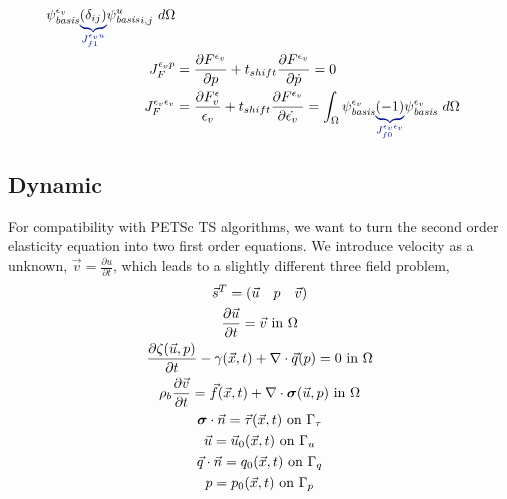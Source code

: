 \begin{align}
  \basisscalar[\epsilon_{v}] \eqnannotate{\left(\delta_{ij}\right)}{J_{f1}^{\epsilon_{v}u}}
  \basisscalar[u]_{i,j} \ d\Omega                                                                                                                                                                                                                             \\
  J_F^{\epsilon_{v}p}            & = \frac{\partial F^{\epsilon_{v}}}{\partial p} + t_{shift} \frac{\partial F^{\epsilon_{v}}}{\partial \dot{p}} = 0                                                                                                          \\
  J_F^{\epsilon_{v}\epsilon_{v}} & = \frac{\partial F^\epsilon_{v}}{\epsilon_{v}} + t_{shift} \frac{\partial F^{\epsilon_{v}}}{\partial \dot{\epsilon_{v}}} =
  \int_{\Omega} \basisscalar[\epsilon_{v}] \eqnannotate{\left(-1\right)}{J_{f0}^{\epsilon_{v}\epsilon_{v}}} \basisscalar[\epsilon_{v}] \ d\Omega
\end{align}

\subsection{Dynamic}

For compatibility with PETSc TS algorithms, we want to turn the second
order elasticity equation into two first order equations. We introduce
velocity as a unknown, $\vec{v}=\frac{\partial u}{\partial t}$, which
leads to a slightly different three field problem,
\begin{gather}
  \vec{s}^{T} = \left(\vec{u} \quad p \quad \vec{v}\right) \\
  \frac{\partial \vec{u}}{\partial t} = \vec{v} \text{ in } \Omega \\
  \frac{\partial \zeta(\vec{u},p)}{\partial t } - \gamma(\vec{x},t) + \nabla \cdot \vec{q}(p) = 0 \text{ in } \Omega \\
  \rho_{b} \frac{\partial \vec{v}}{\partial t} = \vec{f}(\vec{x},t) + \nabla \cdot \bm{\sigma}(\vec{u},p) \text{ in } \Omega \\
  \bm{\sigma} \cdot \vec{n} = \vec{\tau}(\vec{x},t) \text{ on } \Gamma_{\tau} \\
  \vec{u} = \vec{u}_{0}(\vec{x}, t) \text{ on } \Gamma_{u} \\
  \vec{q} \cdot \vec{n} = q_{0}(\vec{x}, t) \text{ on } \Gamma_{q} \\
  p = p_{0}(\vec{x},t) \text{ on } \Gamma_{p}
\end{gather}

